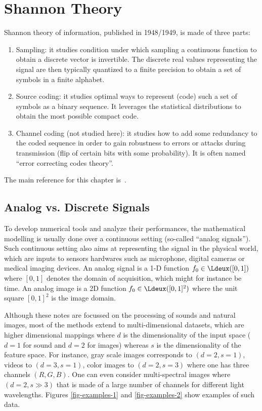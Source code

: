 
\chapter{Shannon Theory}
\label{sec-shannon}

%
Shannon theory of information, published in 1948/1949, is made of three parts:
\begin{enumerate}
	\item Sampling: it studies condition under which sampling a continuous function to obtain a discrete vector is invertible. The discrete real values representing the signal are then typically quantized to a finite precision to obtain a set of symbols in a finite alphabet.  
	\item Source coding: it studies optimal ways to represent (code) such a set of symbols as a binary sequence. It leverages the statistical distributions to obtain the most possible compact code.  
	\item Channel coding (not studied here): it studies how to add some redundancy to the coded sequence in order to gain robustness to errors or attacks during transmission (flip of certain bits with some probability). It is often named ``error correcting codes theory''. 
\end{enumerate}
%
The main reference for this chapter is~\cite{mallat2008wavelet}.


\section{Analog vs. Discrete Signals}

To develop numerical tools and analyze their performances, the mathematical modelling is usually done over a continuous setting (so-called ``analog signals''). 
%
Such continuous setting also aims at representing the signal in the physical world, which are inputs to sensors hardwares such as microphone, digital cameras or medical imaging devices. 
%
An analog signal is a 1-D function $f_0 \in \Ldeux([0,1])$ where $[0,1]$ denotes the domain of acquisition, which might for instance be time. An analog image is a 2D function $f_0 \in \Ldeux([0,1]^2)$ where the unit square $[0,1]^2$ is the image domain.

Although these notes are focussed on the processing of sounds and natural images, most of the methods extend to multi-dimensional datasets, which are higher dimensional mappings
where $d$ is the dimensionality of the input space ($d=1$ for sound and $d=2$ for images) whereas $s$ is the dimensionality of the feature space. For instance, gray scale images corresponds to $(d=2,s=1)$, 
videos to $(d=3, s=1)$, color images to $(d=2, s=3)$ where one has three channels $(R,G,B)$.
One can even consider multi-spectral images where $(d=2, s \gg 3)$ that is made of a large number of channels for different light wavelengths. Figures \ref{fig-examples-1} and \ref{fig-examples-2} show examples of such data.



